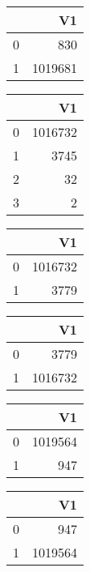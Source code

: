 \bigskip\bigskip
\centering
\begin{tabular}{rr}
  \hline
 & V1 \\ 
  \hline
0 & 830 \\ 
  1 & 1019681 \\ 
   \hline
\end{tabular}

\bigskip\bigskip
\centering
\begin{tabular}{rr}
  \hline
 & V1 \\ 
  \hline
0 & 1016732 \\ 
  1 & 3745 \\ 
  2 &  32 \\ 
  3 &   2 \\ 
   \hline
\end{tabular}

\bigskip\bigskip
\centering
\begin{tabular}{rr}
  \hline
 & V1 \\ 
  \hline
0 & 1016732 \\ 
  1 & 3779 \\ 
   \hline
\end{tabular}

\bigskip\bigskip
\centering
\begin{tabular}{rr}
  \hline
 & V1 \\ 
  \hline
0 & 3779 \\ 
  1 & 1016732 \\ 
   \hline
\end{tabular}

\bigskip\bigskip
\centering
\begin{tabular}{rr}
  \hline
 & V1 \\ 
  \hline
0 & 1019564 \\ 
  1 & 947 \\ 
   \hline
\end{tabular}

\bigskip\bigskip
\centering
\begin{tabular}{rr}
  \hline
 & V1 \\ 
  \hline
0 & 947 \\ 
  1 & 1019564 \\ 
   \hline
\end{tabular}

